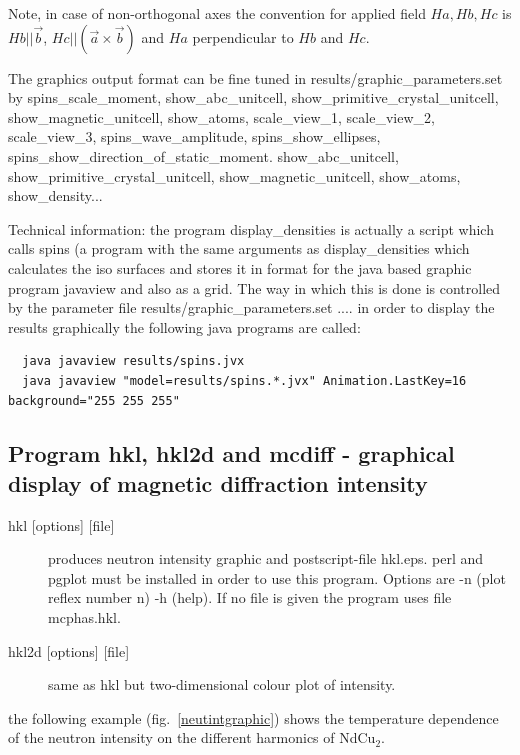                           Note, in case of non-orthogonal axes the convention 
                           for applied field $Ha, Hb,Hc$ 
                            is $Hb||\vec b$, $Hc||(\vec a \times \vec b)$ and $Ha$ perpendicular to $Hb$ and $Hc$.


  The graphics output format can be fine tuned in {\prg results/graphic\_parameters.set} 
  by  {\prg spins\_scale\_moment},
{\prg show\_abc\_unitcell, show\_primitive\_crystal\_unitcell, show\_magnetic\_unitcell, show\_atoms, 
scale\_view\_1,
scale\_view\_2, scale\_view\_3},  
{\prg spins\_wave\_amplitude, spins\_show\_ellipses, spins\_show\_direction\_of\_static\_moment}.
{\prg show\_abc\_unitcell, show\_primitive\_crystal\_unitcell, show\_magnetic\_unitcell, show\_atoms, %
 show\_density}...

Technical information: the program {\prg display\_densities} 
is actually a script which
calls  {\prg spins} 
 (a program with the same arguments as {\prg display\_densities}
which calculates the iso surfaces and stores
it in format for the java based graphic program {\prg javaview} and
also as a grid. The way in which this is done is controlled by 
the parameter file {\prg results/graphic\_parameters.set}
.... in  order to display the results graphically the following java
programs are called:
\begin{verbatim}
  java javaview results/spins.jvx
  java javaview "model=results/spins.*.jvx" Animation.LastKey=16 background="255 255 255"
\end{verbatim}







\subsection{Program {\prg hkl}, {\prg hkl2d} and {\prg mcdiff} - graphical %
display of magnetic diffraction intensity}
\begin{description} 
\item [{{\prg hkl} [options] [file]} ]                   produces neutron intensity graphic
 and postscript-file {\prg hkl.eps}. {\prg perl} and
{\prg pgplot} must be installed in order to use this program.
 Options are -n (plot reflex number n)
-h (help). If no file is given the program uses file {\prg mcphas.hkl}.
\item [{{\prg hkl2d} [options] [file]} ]   same as {\prg hkl} but two-dimensional colour %
plot of intensity.
\end{description} 
the following example (fig.~\ref{neutintgraphic}) shows the temperature dependence of the neutron intensity
on the different harmonics of NdCu$_2$.

